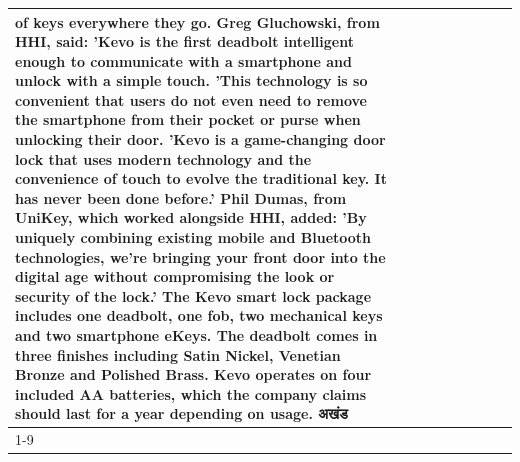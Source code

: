 \begin{table}[H]
\begin{tabular}{lllrlllll}
of keys everywhere they go. Greg Gluchowski, from HHI, said: 'Kevo is the first deadbolt intelligent enough to communicate with a smartphone and unlock with a simple touch. 'This technology is so convenient that users do not even need to remove the smartphone from their pocket or purse when unlocking their door. 'Kevo is a game-changing door lock that uses modern technology and the convenience of touch to evolve the traditional key. It has never been done before.' Phil Dumas, from UniKey, which worked alongside HHI, added: 'By uniquely combining existing mobile and Bluetooth technologies, we’re bringing your front door into the digital age without compromising the look or security of the lock.' The Kevo smart lock package includes one deadbolt, one fob, two mechanical keys and two smartphone eKeys. The deadbolt comes in three finishes including Satin Nickel, Venetian Bronze and Polished Brass. Kevo operates on four included AA batteries, which the company claims should last for a year depending on usage. अखंड \\
\cline{1-9}

\end{tabular}
\end{table}
